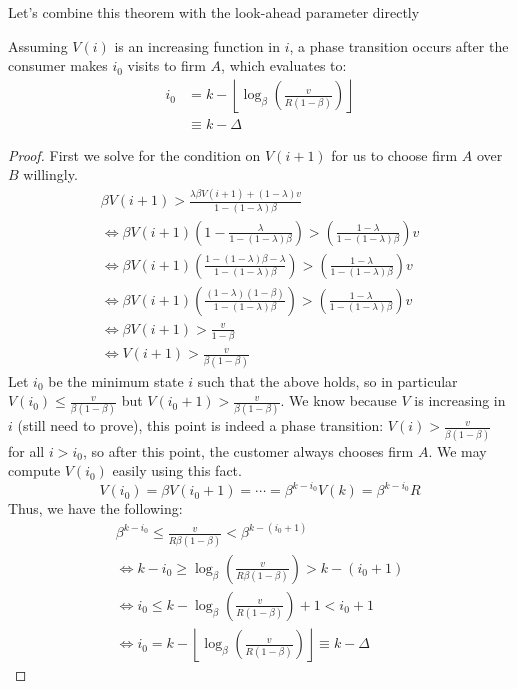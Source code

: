 {\arpit Let's combine this theorem with the look-ahead parameter directly}

\begin{theorem} Assuming $V(i)$ is an increasing function in $i$, a phase transition occurs after the consumer makes $i_0$ visits to firm $A$, which evaluates to:
\begin{align*}
i_0 &= k - \left\lfloor \log_{\beta}\left(\frac{v}{R(1-\beta)}\right)\right\rfloor \\
&\equiv k-\Delta
\end{align*}
\end{theorem}

\begin{proof}
First we solve for the condition on $V(i+1)$ for us to choose firm $A$ over $B$ willingly.
\begin{gather*}
\beta V(i+1) > \frac{\lambda \beta V(i+1) + (1-\lambda)v}{1-(1-\lambda)\beta} \\
\iff \beta V(i+1) \left(1-\frac{\lambda}{1-(1-\lambda)\beta} \right) > \left(\frac{1-\lambda}{1-(1-\lambda)\beta} \right) v \\
\iff \beta V(i+1) \left(\frac{1-(1-\lambda)\beta -\lambda}{1-(1-\lambda)\beta} \right) > \left(\frac{1-\lambda}{1-(1-\lambda)\beta} \right) v \\
\iff \beta V(i+1) \left(\frac{(1-\lambda)(1-\beta)}{1-(1-\lambda)\beta} \right) > \left(\frac{1-\lambda}{1-(1-\lambda)\beta} \right) v \\
\iff \beta V(i+1) > \frac{v}{1-\beta} \\
\iff V(i+1) > \frac{v}{\beta(1-\beta)}
\end{gather*}
Let $i_0$ be the minimum state $i$ such that the above holds, so in particular $V(i_0) \le \frac{v}{\beta(1-\beta)}$ but $V(i_0+1) > \frac{v}{\beta(1-\beta)}$. We know because $V$ is increasing in $i$ (still need to prove), this point is indeed a phase transition: $V(i) > \frac{v}{\beta(1-\beta)}$ for all $i > i_0$, so after this point, the customer always chooses firm $A$. We may compute $V(i_0)$ easily using this fact.
\begin{equation*}
V(i_0) = \beta V(i_0+1) = \cdots = \beta^{k-i_0}V(k) = \beta^{k-i_0}R
\end{equation*}
Thus, we have the following:
\begin{gather*}
\beta^{k-i_0} \le \frac{v}{R\beta(1-\beta)} < \beta^{k-(i_0+1)} \\ 
\iff k-i_0 \ge \log_{\beta}\left(\frac{v}{R\beta(1-\beta)} \right) > k-(i_0+1) \\
\iff i_0 \le k - \log_{\beta}\left(\frac{v}{R(1-\beta)} \right) + 1 < i_0 + 1\\
\iff i_0 = k - \left\lfloor \log_{\beta}\left(\frac{v}{R(1-\beta)}\right) \right\rfloor \equiv k-\Delta
\end{gather*}
\end{proof}


